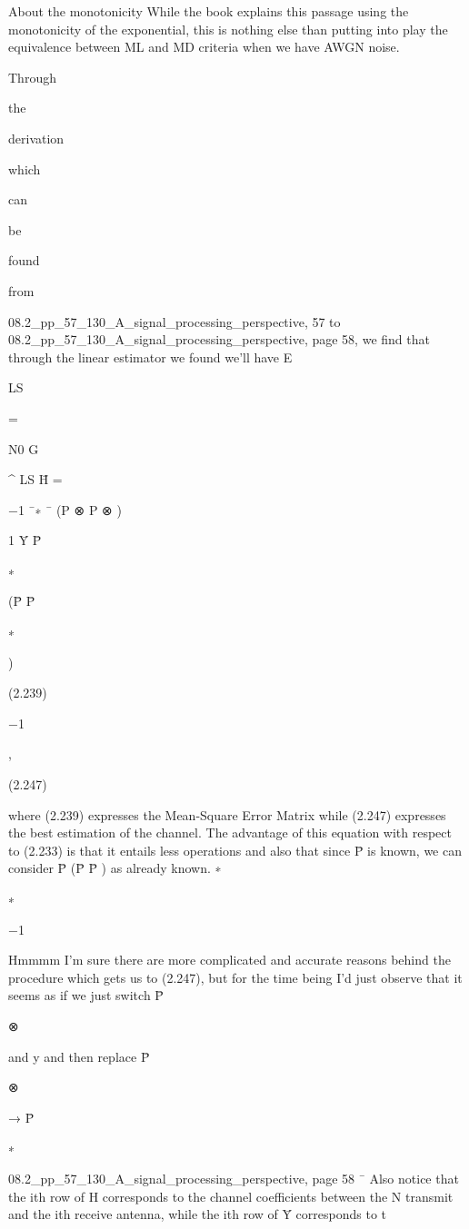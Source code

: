 {{{​About the monotonicity While the book explains this passage using the monotonicity of the exponential, this is nothing else than putting into play the equivalence between ML and MD criteria when we have AWGN noise.

Through

the

derivation

which

can

be

found

from

08.2_pp_57_130_A_signal_processing_perspective,
57 to 08.2_pp_57_130_A_signal_processing_perspective, page 58, we find that through the linear estimator we found we'll have E

LS

=

N0 G

^ LS H̄
=

−1
¯∗ ¯
(P ⊗ P ⊗ )

1 Ȳ P̄

∗

(P̄ P̄

∗

)

(2.239)

−1

,

(2.247)

\sqrtG

where (2.239) expresses the Mean-Square Error Matrix while (2.247) expresses the best estimation of the channel.
The advantage of this equation with respect to (2.233) is that it entails less operations and also that since P̄ is known, we can consider P̄ (P̄ P̄ ) as already known.
∗

∗

−1

​Hmmmm I'm sure there are more complicated and accurate reasons behind the procedure which gets us to (2.247), but for the time being I'd just observe that it seems as if we just switch P̄

⊗

and y and then replace P̄

⊗

→ P̄

∗

08.2_pp_57_130_A_signal_processing_perspective, page 58
¯
Also notice that the ith row of H corresponds to the channel coefficients between the N transmit and the ith receive antenna, while the ith row of Ȳ corresponds to t

}}}
